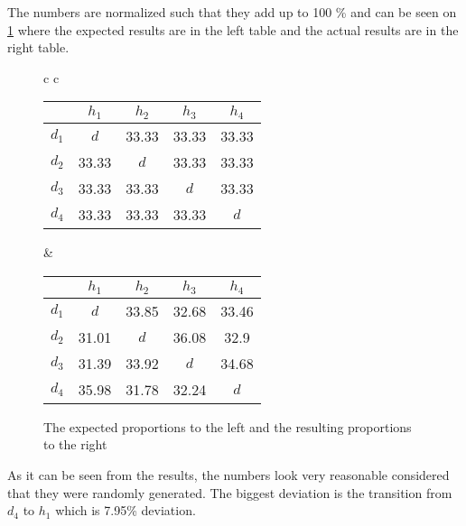 The numbers are normalized such that they add up to 100 \% and can be seen on \cref{even_results} where the expected results are in the left table and the actual results are in the right table.

\begin{figure}
	\centering
	\begin{tabular} {c c }
		
		\begin{tabular}{ | c | c c c c |}
			\hline
			& $ h_1 $ & $ h_2 $ & $ h_3 $ & $ h_4 $\\
			\hline
			$ d_1 $ & $ d $ & 33.33 & 33.33 & 33.33\\
			$ d_2 $ & 33.33 & $ d $ & 33.33 & 33.33\\
			$ d_3 $ & 33.33 & 33.33 & $ d $ & 33.33\\
			$ d_4 $ & 33.33 & 33.33 & 33.33 & $ d $\\
			\hline
		\end{tabular}
		
		&
		
		\begin{tabular}{ | c | c c c c |}
			\hline
			& $ h_1 $ & $ h_2 $ & $ h_3 $ & $ h_4 $\\
			\hline
			$ d_1 $ & $ d $ & 33.85 & 32.68 & 33.46\\
			$ d_2 $ & 31.01 & $ d $ & 36.08 & 32.9\\
			$ d_3 $ & 31.39 & 33.92 & $ d $ & 34.68 \\
			$ d_4 $ & 35.98 & 31.78 & 32.24 & $ d $\\
			\hline
		\end{tabular}
	\end{tabular}
	\caption{The expected proportions to the left and the resulting proportions to the right}\label{even_results}
\end{figure}

As it can be seen from the results, the numbers look very reasonable considered that they were randomly generated. 
The biggest deviation is the transition from $ d_4 $ to $ h_1 $ which is 7.95\% deviation. 

